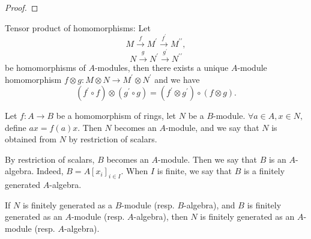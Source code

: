 \begin{proof}

\end{proof}
Tensor product of homomorphisms: Let
$$M\stackrel{f}{\rightarrow}
M^{\prime}\stackrel{f^{\prime}}{\rightarrow} M^{\prime\prime},$$
$$N\stackrel{g}{\rightarrow}
N^{\prime}\stackrel{g^{\prime}}{\rightarrow} N^{\prime\prime}$$ be
homomorphisms of $A$-modules, then there exists a unique $A$-module
homomorphism $f\otimes g: M\otimes N\rightarrow M^{\prime}\otimes
N^{\prime}$ and we have
$$(f^{\prime}\circ f)\otimes (g^{\prime}\circ g) = (f^{\prime}\otimes
g^{\prime})\circ (f\otimes g).$$
\begin{Def}
Let $f:A\rightarrow B$ be a homomorphism of rings, let $N$ be a
$B$-module. $\forall a\in A, x\in N,$ define $ax=f(a)x.$ Then $N$
becomes an $A$-module, and we say that $N$ is obtained from $N$ by
restriction of scalars.
\end{Def}
\begin{remark}
By restriction of scalars, $B$ becomes an $A$-module. Then we say
that $B$ is an $A$-algebra. Indeed, $B=A[x_i]_{i\in I}.$ When $I$ is
finite, we say that $B$ is a finitely generated $A$-algebra.
\end{remark}
\begin{prop}
If $N$ is finitely generated as a $B$-module (resp. $B$-algebra),
and $B$ is finitely generated as an $A$-module (resp. $A$-algebra),
then $N$ is finitely generated as an $A$-module (resp. $A$-algebra).
\end{prop}
